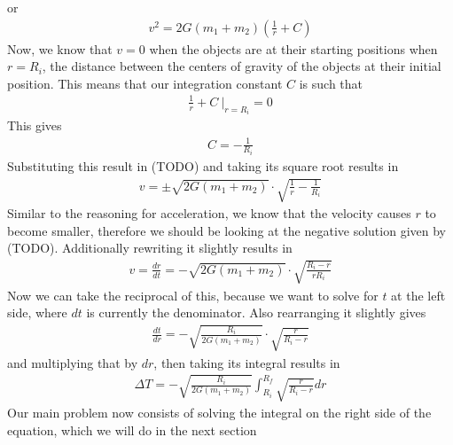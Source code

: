 \documentclass{article}
\begin{document}
or 
\begin{align}
    v^2 = 2G (m_1 + m_2) (\frac{1}{r} + C)
\end{align}
Now, we know that $v=0$ when the objects are at their starting positions when $r=R_i$, the distance between the centers of gravity of the objects at their initial position. This means that our integration constant $C$ is such that
\begin{align}
    \frac{1}{r} + C ~ \bigg|_{r=R_i} = 0
\end{align}
This gives
\begin{align}
    C = -\frac{1}{R_i}
\end{align}
Substituting this result in (TODO) and taking its square root results in
\begin{align}
    v = \pm \sqrt{2G (m_1 + m_2)}  \cdot \sqrt{\frac{1}{r} - \frac{1}{R_i}}
\end{align}
Similar to the reasoning for acceleration, we know that the velocity causes $r$ to become smaller, therefore we should be looking at the negative solution given by (TODO). Additionally rewriting it slightly results in
\begin{align}
    v = \frac{dr}{dt} = - \sqrt{2G(m_1 + m_2)} \cdot \sqrt{\frac{R_i - r}{ rR_i}}
\end{align}
Now we can take the reciprocal of this, because we want to solve for $t$ at the left side, where $dt$ is currently the denominator. Also rearranging it slightly gives
\begin{align}
    \frac{dt}{dr} = - \sqrt{\frac{R_i}{2G(m_1 + m_2)}} \cdot \sqrt{\frac{r}{R_i - r}}
\end{align}
and multiplying that by $dr$, then taking its integral results in
\begin{align}
    \Delta T =  - \sqrt{\frac{R_i}{2G(m_1 + m_2)}} \int_{R_i}^{R_f} \sqrt{\frac{r}{R_i - r}} dr
\end{align}
Our main problem now consists of solving the integral on the right side of the equation, which we will do in the next section
\end{document}
